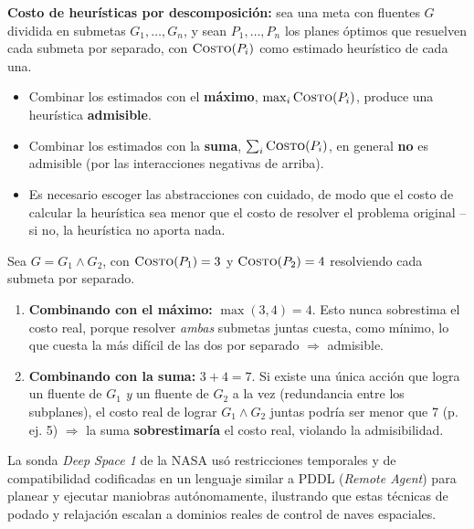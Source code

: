 \textbf{Costo de heurísticas por descomposición:} sea una meta con fluentes $G$ dividida en
submetas $G_1,\ldots,G_n$, y sean $P_1,\ldots,P_n$ los planes óptimos que resuelven cada submeta por
separado, con $\textsc{Costo}(P_i)$ como estimado heurístico de cada una.
\begin{itemize}
    \item Combinar los estimados con el \textbf{máximo}, $\max_i \textsc{Costo}(P_i)$, produce una
    heurística \textbf{admisible}.
    \item Combinar los estimados con la \textbf{suma}, $\sum_i \textsc{Costo}(P_i)$, en general
    \textbf{no} es admisible (por las interacciones negativas de arriba).
    \item Es necesario escoger las abstracciones con cuidado, de modo que el costo de calcular la
    heurística sea menor que el costo de resolver el problema original --si no, la heurística no
    aporta nada.
\end{itemize}

\begin{example}
Sea $G=G_1\land G_2$, con $\textsc{Costo}(P_1)=3$ y $\textsc{Costo}(P_2)=4$ resolviendo cada submeta
por separado.
\begin{enumerate}
    \item \textbf{Combinando con el máximo:} $\max(3,4)=4$. Esto nunca sobrestima el costo real,
    porque resolver \emph{ambas} submetas juntas cuesta, como mínimo, lo que cuesta la más difícil de
    las dos por separado $\Rightarrow$ admisible.
    \item \textbf{Combinando con la suma:} $3+4=7$. Si existe una única acción que logra un fluente
    de $G_1$ \emph{y} un fluente de $G_2$ a la vez (redundancia entre los subplanes), el costo real
    de lograr $G_1\land G_2$ juntas podría ser menor que 7 (p. ej. 5) $\Rightarrow$ la suma
    \textbf{sobrestimaría} el costo real, violando la admisibilidad.
\end{enumerate}
\end{example}

\begin{example}
La sonda \textit{Deep Space 1} de la NASA usó restricciones temporales y de compatibilidad
codificadas en un lenguaje similar a PDDL (\textit{Remote Agent}) para planear y ejecutar maniobras
autónomamente, ilustrando que estas técnicas de podado y relajación escalan a dominios reales de
control de naves espaciales.
\end{example}

